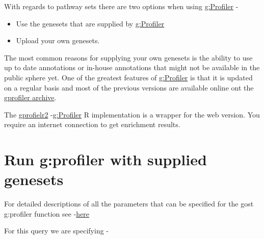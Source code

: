 \documentclass[
]{book}
\providecommand{\tightlist}{%
  \setlength{\itemsep}{0pt}\setlength{\parskip}{0pt}}
\begin{document}
With regards to pathway sets there are two options when using \href{https://biit.cs.ut.ee/gprofiler/gost}{g:Profiler} -

\begin{itemize}
\tightlist
\item
  Use the genesets that are supplied by \href{https://biit.cs.ut.ee/gprofiler/gost}{g:Profiler}
\item
  Upload your own genesets.
\end{itemize}

The most common reasons for supplying your own genesets is the ability to use up to date annotations or in-house annotations that might not be available in the public sphere yet. One of the greatest features of \href{https://biit.cs.ut.ee/gprofiler/gost}{g:Profiler} is that it is updated on a regular basis and most of the previous versions are available online ont the \href{https://biit.cs.ut.ee/gprofiler/page/archives}{gprofiler archive}.

The \href{https://biit.cs.ut.ee/gprofiler/page/r}{gprofielr2} -\href{https://biit.cs.ut.ee/gprofiler/gost}{g:Profiler} R implementation is a wrapper for the web version. You require an internet connection to get enrichment results.

\hypertarget{run-gprofiler-with-supplied-genesets}{%
\section{Run g:profiler with supplied genesets}\label{run-gprofiler-with-supplied-genesets}}

For detailed descriptions of all the parameters that can be specified for the gost g:profiler function see -\href{https://rdrr.io/cran/gprofiler2/man/gost.html}{here}

For this query we are specifying -
\end{document}
